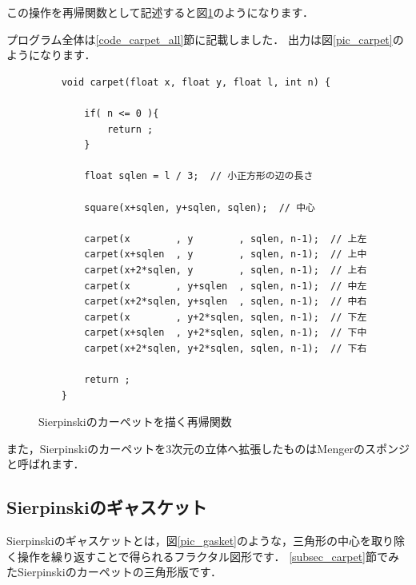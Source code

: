 \documentclass[dvipdfmx]{jsarticle}
\theoremstyle{definition}
\begin{document}
この操作を再帰関数として記述すると図\ref{code_carpet}のようになります．

プログラム全体は\ref{code_carpet_all}節に記載しました．
出力は図\ref{pic_carpet}のようになります．

\begin{figure}[ht]
\begin{center}
\begin{oframed}
\footnotesize
\begin{verbatim}
    void carpet(float x, float y, float l, int n) {

        if( n <= 0 ){
            return ;
        }

        float sqlen = l / 3;  // 小正方形の辺の長さ

        square(x+sqlen, y+sqlen, sqlen);  // 中心

        carpet(x        , y        , sqlen, n-1);  // 上左
        carpet(x+sqlen  , y        , sqlen, n-1);  // 上中
        carpet(x+2*sqlen, y        , sqlen, n-1);  // 上右
        carpet(x        , y+sqlen  , sqlen, n-1);  // 中左
        carpet(x+2*sqlen, y+sqlen  , sqlen, n-1);  // 中右
        carpet(x        , y+2*sqlen, sqlen, n-1);  // 下左
        carpet(x+sqlen  , y+2*sqlen, sqlen, n-1);  // 下中
        carpet(x+2*sqlen, y+2*sqlen, sqlen, n-1);  // 下右

        return ;
    }
\end{verbatim}
\end{oframed}
\end{center}
\caption{Sierpinskiのカーペットを描く再帰関数}
\label{code_carpet}
\end{figure}

また，Sierpinskiのカーペットを3次元の立体へ拡張したものはMengerのスポンジと呼ばれます．


\subsection{Sierpinskiのギャスケット}

Sierpinskiのギャスケットとは，図\ref{pic_gasket}のような，三角形の中心を取り除く操作を繰り返すことで得られるフラクタル図形です．
\ref{subsec_carpet}節でみたSierpinskiのカーペットの三角形版です．
\end{document}
